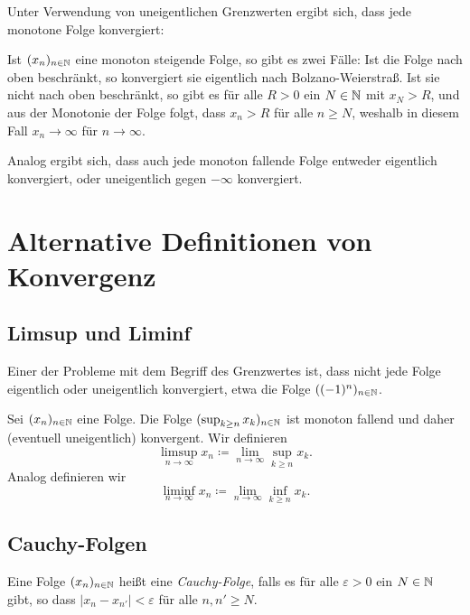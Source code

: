 \documentclass[a4paper,10pt]{article}
\begin{document}
Unter Verwendung von uneigentlichen Grenzwerten ergibt sich, dass jede monotone Folge konvergiert:

Ist $(x_n)_{n \in \mathbb{N}}$ eine monoton steigende Folge, so gibt es zwei Fälle: Ist die Folge nach oben beschränkt, so konvergiert sie eigentlich nach Bolzano-Weierstraß. Ist sie nicht nach oben beschränkt, so gibt es für alle $R > 0$ ein $N \in \mathbb{N}$ mit $x_N > R$, und aus der Monotonie der Folge folgt, dass $x_n > R$ für alle $n \geq N$, weshalb in diesem Fall $x_n \to \infty$ für $n \to \infty$.

Analog ergibt sich, dass auch jede monoton fallende Folge entweder eigentlich konvergiert, oder uneigentlich gegen $-\infty$ konvergiert.





\section{Alternative Definitionen von Konvergenz}



\subsection{Limsup und Liminf}
Einer der Probleme mit dem Begriff des Grenzwertes ist, dass nicht jede Folge eigentlich oder uneigentlich konvergiert, etwa die Folge $((-1)^n)_{n \in \mathbb{N}}$.


\begin{defi}
 Sei $(x_n)_{n \in \mathbb{N}}$ eine Folge. Die Folge $(\sup_{k \geq n} x_k)_{n \in \mathbb{N}}$ ist monoton fallend und daher (eventuell uneigentlich) konvergent. Wir definieren
 \[
  \limsup_{n \to \infty} x_n \coloneqq \lim_{n \to \infty} \sup_{k \geq n} x_k.
 \]
 Analog definieren wir
 \[
  \liminf_{n \to \infty} x_n \coloneqq \lim_{n \to \infty} \inf_{k \geq n} x_k.
 \]
\end{defi}



\subsection{Cauchy-Folgen}


\begin{defi}
 Eine Folge $(x_n)_{n \in \mathbb{N}}$ heißt eine \emph{Cauchy-Folge}, falls es für alle $\varepsilon > 0$ ein $N \in \mathbb{N}$ gibt, so dass $|x_n - x_{n'}| < \varepsilon$ für alle $n, n' \geq N$.
\end{defi}
\end{document}
